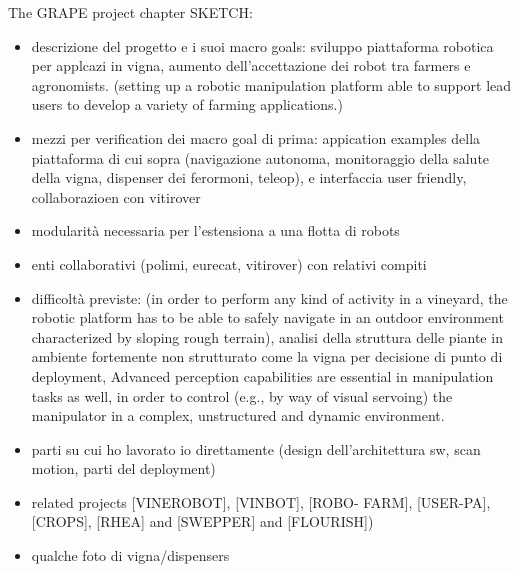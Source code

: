 The GRAPE project chapter SKETCH:
\begin{itemize}
	\item descrizione del progetto e i suoi macro goals: sviluppo piattaforma robotica per applcazi in vigna, aumento dell'accettazione dei robot tra farmers e agronomists. (setting up a robotic manipulation platform able to support lead users to
develop a variety of farming applications.)
	\item mezzi per verification dei macro goal di prima: appication examples della piattaforma di cui sopra  (navigazione autonoma, monitoraggio  della salute della vigna, dispenser dei ferormoni, teleop), e  interfaccia user friendly, collaborazioen con vitirover
	\item modularità necessaria per l'estensiona a una flotta di robots
	\item enti collaborativi (polimi, eurecat, vitirover) con relativi compiti
	\item difficoltà previste: (in order to perform any kind of activity
in a vineyard, the robotic platform has to be able to safely navigate in an outdoor environment characterized by sloping rough terrain), analisi della struttura delle piante in ambiente fortemente non strutturato come la vigna per decisione di punto di deployment, Advanced perception capabilities are essential in manipulation tasks as well, in order to control (e.g.,
by way of visual servoing) the manipulator in a complex, unstructured and dynamic environment.
	\item parti su cui ho lavorato io direttamente (design dell'architettura sw, scan motion, parti del deployment)
	\item related projects [VINEROBOT], [VINBOT], [ROBO-
FARM], [USER-PA], [CROPS], [RHEA] and [SWEPPER] and [FLOURISH])
	\item qualche foto di vigna/dispensers
\end{itemize}

